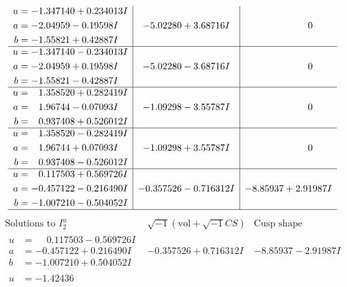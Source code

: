 \documentclass[1p]{elsarticle_modified}
\theoremstyle{definition}
\newcommand{\I}{\sqrt{-1}}
\begin{document}
$$\begin{array}{c|c|c}
\begin{aligned}
u &= -1.347140 + 0.234013 I \\
a &= -2.04959 - 0.19598 I \\
b &= -1.55821 + 0.42887 I\end{aligned}
 & -5.02280 + 3.68716 I & \phantom{-0.000000 } 0 \\ \hline\begin{aligned}
u &= -1.347140 - 0.234013 I \\
a &= -2.04959 + 0.19598 I \\
b &= -1.55821 - 0.42887 I\end{aligned}
 & -5.02280 - 3.68716 I & \phantom{-0.000000 } 0 \\ \hline\begin{aligned}
u &= \phantom{-}1.358520 + 0.282419 I \\
a &= \phantom{-}1.96744 - 0.07093 I \\
b &= \phantom{-}0.937408 + 0.526012 I\end{aligned}
 & -1.09298 - 3.55787 I & \phantom{-0.000000 } 0 \\ \hline\begin{aligned}
u &= \phantom{-}1.358520 - 0.282419 I \\
a &= \phantom{-}1.96744 + 0.07093 I \\
b &= \phantom{-}0.937408 - 0.526012 I\end{aligned}
 & -1.09298 + 3.55787 I & \phantom{-0.000000 } 0 \\ \hline\begin{aligned}
u &= \phantom{-}0.117503 + 0.569726 I \\
a &= -0.457122 - 0.216490 I \\
b &= -1.007210 - 0.504052 I\end{aligned}
 & -0.357526 - 0.716312 I & -8.85937 + 2.91987 I\\
 \hline 
 \end{array}$$\newpage$$\begin{array}{c|c|c}  
\text{Solutions to }I^u_{2}& \I (\text{vol} + \sqrt{-1}CS) & \text{Cusp shape}\\
 \hline 
\begin{aligned}
u &= \phantom{-}0.117503 - 0.569726 I \\
a &= -0.457122 + 0.216490 I \\
b &= -1.007210 + 0.504052 I\end{aligned}
 & -0.357526 + 0.716312 I & -8.85937 - 2.91987 I \\ \hline\begin{aligned}
u &= -1.42436\phantom{ +0.000000I} \\

\end{aligned}
\end{array}$$
\end{document}
